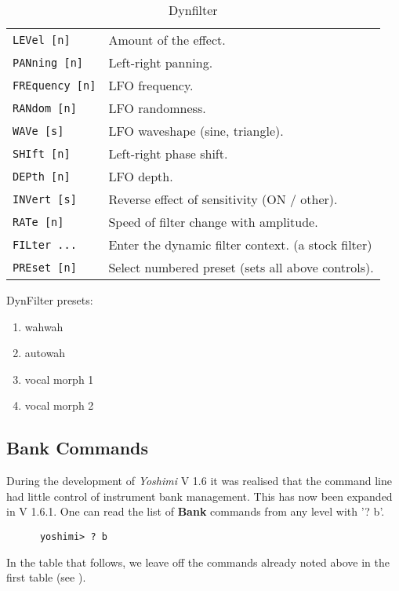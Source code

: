    \begin{table}[H]
      \centering
      \caption{Dynfilter}
      \begin{tabular}{l l}
\texttt{LEVel [n]} &
   Amount of the effect. \\
\texttt{PANning [n]} &
   Left-right panning. \\
\texttt{FREquency [n]} &
   LFO frequency. \\
\texttt{RANdom [n]} &
   LFO randomness. \\
\texttt{WAVe [s]} &
   LFO waveshape (sine, triangle). \\
\texttt{SHIft [n]} &
   Left-right phase shift. \\
\texttt{DEPth [n]} &
   LFO depth. \\
\texttt{INVert [s]} &
   Reverse effect of sensitivity (ON / other). \\
\texttt{RATe [n]} &
   Speed of filter change with amplitude. \\
\texttt{FILter ...} &
   Enter the dynamic filter context. (a stock filter)\\
\texttt{PREset [n]} &
   Select numbered preset (sets all above controls). \\
      \end{tabular}
   \end{table}
DynFilter presets:
   \begin{enumerate}
   \item wahwah
   \item autowah
   \item vocal morph 1
   \item vocal morph 2
   \end{enumerate}

\subsection{Bank Commands}
\label{subsec:command_line_bank_command_list}

   During the development of \textsl{Yoshimi} V 1.6 it was realised that
   the command line had little control of instrument bank management.
   This has now been expanded in V 1.6.1. One can read the list of
   \textbf{Bank} commands from any level with '? b'.

   \begin{verbatim}
      yoshimi> ? b
   \end{verbatim}

   In the table that follows, we leave off the commands already noted
   above in the first table
   (see ).

